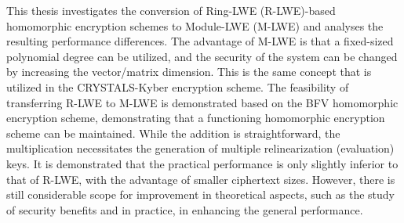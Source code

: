This thesis investigates the conversion of Ring-LWE (R-LWE)-based homomorphic encryption schemes to Module-LWE (M-LWE) and analyses the resulting performance differences. The advantage of M-LWE is that a fixed-sized polynomial degree can be utilized, and the security of the system can be changed by increasing the vector/matrix dimension. This is the same concept that is utilized in the CRYSTALS-Kyber encryption scheme. The feasibility of transferring R-LWE to M-LWE is demonstrated based on the BFV homomorphic encryption scheme, demonstrating that a functioning homomorphic encryption scheme can be maintained. While the addition is straightforward, the multiplication necessitates the generation of multiple relinearization (evaluation) keys. It is demonstrated that the practical performance is only slightly inferior to that of R-LWE, with the advantage of smaller ciphertext sizes. However, there is still considerable scope for improvement in theoretical aspects, such as the study of security benefits and in practice, in enhancing the general performance.